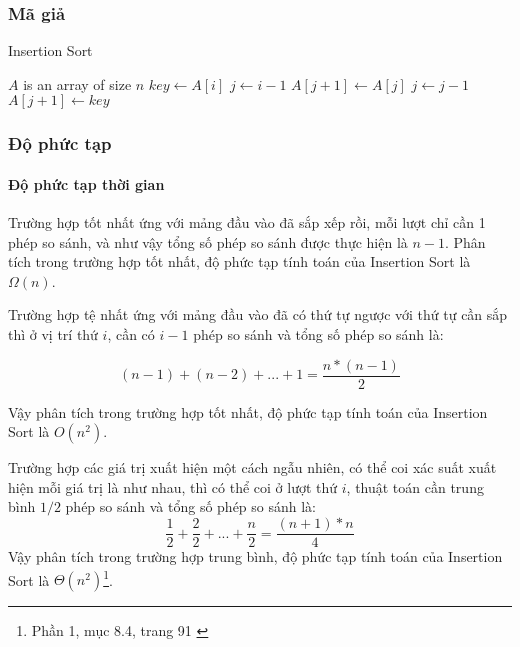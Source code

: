 \subsubsection{Mã giả}
 
\begin{algorithm}
\caption{Insertion Sort}
\label{alg:insertion-sort}
\begin{algorithmic}

\Require $A$ is an array of size $n$
    \State $key \gets A[i]$ 
    \State $j \gets i - 1$
        \State $A[j+1] \gets A[j]$ 
        \State $j \gets j - 1$
    \EndWhile
    \State $A[j+1] \gets key$ 
\EndFor
\EndFunction

\end{algorithmic}
\end{algorithm}

\subsubsection{Độ phức tạp}
\paragraph{Độ phức tạp thời gian}
Trường hợp tốt nhất ứng với mảng đầu vào đã sắp xếp rồi, mỗi lượt chỉ cần 1 phép so sánh, và như vậy tổng số phép so sánh được thực hiện là $n - 1$. Phân tích trong trường hợp tốt nhất, độ phức tạp tính toán của Insertion Sort là $\Omega(n)$.

Trường hợp tệ nhất ứng với mảng đầu vào đã có thứ tự ngược với thứ tự cần sắp thì ở vị trí thứ $i$, cần có $i - 1$ phép so sánh và tổng số phép so sánh là: 

$$(n-1) + (n-2) + ... + 1 = \frac{n* (n-1)}{2}$$ 

Vậy phân tích trong trường hợp tốt nhất, độ phức tạp tính toán của Insertion Sort là $O(n^2)$.

Trường hợp các giá trị xuất hiện một cách ngẫu nhiên, có thể coi xác suất xuất hiện mỗi giá trị là như nhau, thì có thể coi ở lượt thứ $i$, thuật toán cần trung bình $1 / 2$ phép so sánh và tổng số phép so sánh là: $$\frac{1}{2} + \frac{2}{2} + ... + \frac{n}{2} = \frac{(n + 1) * n}{4}$$
Vậy phân tích trong trường hợp trung bình, độ phức tạp tính toán của Insertion Sort là $\Theta(n^2)$\footnote{Phần 1, mục 8.4, trang 91 \cite{hoang1999giaithuat}}.

